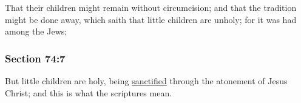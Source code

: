 		That their children might remain without circumcision; and that the tradition might be done away, which saith that little children are unholy; for it was had among the Jews;


	\subsubsection{Section 74:7} %
		\label{DC74-7}

		But little children are holy, being \hyperref[SANCTIFICATION]{sanctified} through the atonement of Jesus Christ; and this is what the scriptures mean.

